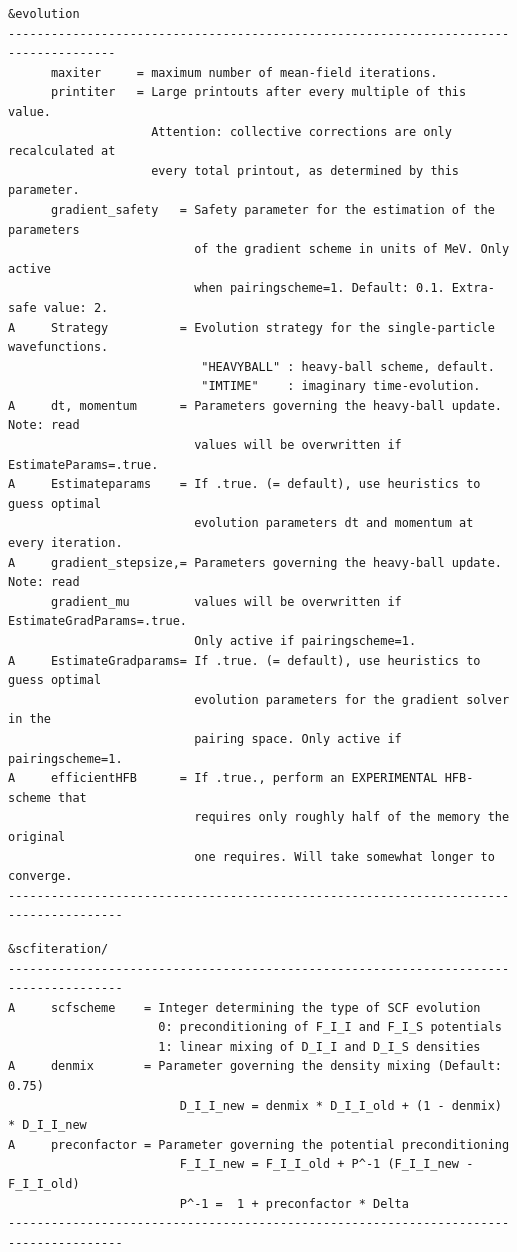 \documentclass[print,amsmath,amssymb,aps,prc,nofootinbib,notitlepage]{revtex4-1}
\begin{document}
\clearpage
\begin{Verbatim}
&evolution
-------------------------------------------------------------------------------------
      maxiter     = maximum number of mean-field iterations.
      printiter   = Large printouts after every multiple of this value. 
                    Attention: collective corrections are only recalculated at 
                    every total printout, as determined by this parameter.
      gradient_safety   = Safety parameter for the estimation of the parameters
                          of the gradient scheme in units of MeV. Only active 
                          when pairingscheme=1. Default: 0.1. Extra-safe value: 2.          
A     Strategy          = Evolution strategy for the single-particle wavefunctions.
                           "HEAVYBALL" : heavy-ball scheme, default.
                           "IMTIME"    : imaginary time-evolution.               
A     dt, momentum      = Parameters governing the heavy-ball update. Note: read
                          values will be overwritten if EstimateParams=.true.
A     Estimateparams    = If .true. (= default), use heuristics to guess optimal
                          evolution parameters dt and momentum at every iteration.
A     gradient_stepsize,= Parameters governing the heavy-ball update. Note: read
      gradient_mu         values will be overwritten if EstimateGradParams=.true.
                          Only active if pairingscheme=1.
A     EstimateGradparams= If .true. (= default), use heuristics to guess optimal
                          evolution parameters for the gradient solver in the 
                          pairing space. Only active if pairingscheme=1.
A     efficientHFB      = If .true., perform an EXPERIMENTAL HFB-scheme that 
                          requires only roughly half of the memory the original
                          one requires. Will take somewhat longer to converge.
--------------------------------------------------------------------------------------
\end{Verbatim}

\begin{Verbatim}
&scfiteration/
--------------------------------------------------------------------------------------
A     scfscheme    = Integer determining the type of SCF evolution
                     0: preconditioning of F_I_I and F_I_S potentials
                     1: linear mixing of D_I_I and D_I_S densities
A     denmix       = Parameter governing the density mixing (Default: 0.75)
                        D_I_I_new = denmix * D_I_I_old + (1 - denmix) * D_I_I_new
A     preconfactor = Parameter governing the potential preconditioning
                        F_I_I_new = F_I_I_old + P^-1 (F_I_I_new - F_I_I_old)
                        P^-1 =  1 + preconfactor * Delta
--------------------------------------------------------------------------------------
\end{Verbatim}
\end{document}
